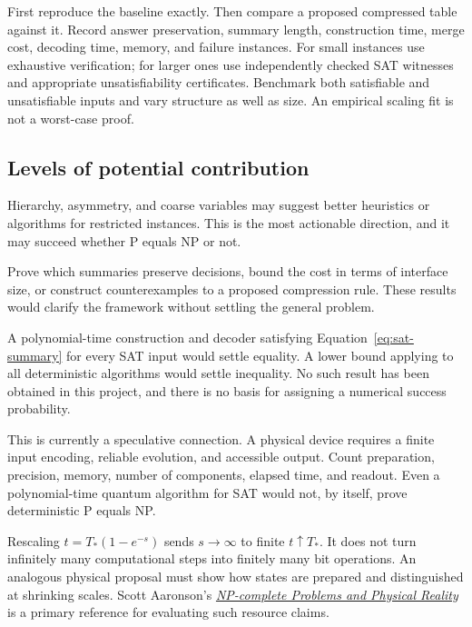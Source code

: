 \documentclass[11pt]{article}
\theoremstyle{definition}
\theoremstyle{plain}
\theoremstyle{remark}
\begin{document}
First reproduce the baseline exactly. Then compare a proposed compressed table against it. Record answer preservation, summary length, construction time, merge cost, decoding time, memory, and failure instances. For small instances use exhaustive verification; for larger ones use independently checked SAT witnesses and appropriate unsatisfiability certificates. Benchmark both satisfiable and unsatisfiable inputs and vary structure as well as size. An empirical scaling fit is not a worst-case proof.

\subsection{Levels of potential contribution}

\begin{description}[style=nextline,leftmargin=0pt,labelindent=0pt,labelwidth=0pt,labelsep=0pt]
 \item[Level 1: useful algorithms for selected systems.]
 Hierarchy, asymmetry, and coarse variables may suggest better heuristics or algorithms for restricted instances. This is the most actionable direction, and it may succeed whether P equals NP or not.
 \item[Level 2: rigorous statements for a defined model.]
 Prove which summaries preserve decisions, bound the cost in terms of interface size, or construct counterexamples to a proposed compression rule. These results would clarify the framework without settling the general problem.
 \item[Level 3: a route to the general question.]
 A polynomial-time construction and decoder satisfying Equation~\eqref{eq:sat-summary} for every SAT input would settle equality. A lower bound applying to all deterministic algorithms would settle inequality. No such result has been obtained in this project, and there is no basis for assigning a numerical success probability.
 \item[Level 4: fluid or quantum computation.]
 This is currently a speculative connection. A physical device requires a finite input encoding, reliable evolution, and accessible output. Count preparation, precision, memory, number of components, elapsed time, and readout. Even a polynomial-time quantum algorithm for SAT would not, by itself, prove deterministic P equals NP.
\end{description}

Rescaling $t=T_\ast(1-e^{-s})$ sends $s\to\infty$ to finite $t\uparrow T_\ast$. It does not turn infinitely many computational steps into finitely many bit operations. An analogous physical proposal must show how states are prepared and distinguished at shrinking scales. Scott Aaronson's \href{https://www.scottaaronson.com/papers/npcomplete.pdf}{\emph{NP-complete Problems and Physical Reality}} is a primary reference for evaluating such resource claims.
\end{document}
